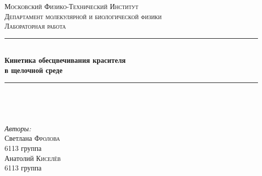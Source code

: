 \documentclass[a4paper, 12pt]{article}
\begin{document}
\begin{titlepage}

\newcommand{\HRule}{\rule{\linewidth}{0.5mm}} %

\center %
 

\textsc{\LARGE Московский Физико-Технический Институт}\\[1,5cm] %
\textsc{\Large Департамент молекулярной и биологической физики}\\[2cm] %
\textsc{\large Лабораторная работа}\\[0.5cm] %


\HRule
\\[0.4cm]
{ \huge \bfseries Кинетика обесцвечивания красителя \\в щелочной среде}
\\[0.2cm] %
\HRule
\\[1.5cm]


 
\begin{minipage}{0.4\textwidth}
	\begin{flushleft}		
	\end{flushleft}
\end{minipage}
~
\begin{minipage}{0.4\textwidth}
	\begin{flushright} \large
		\emph{Авторы:}\\
		Светлана \textsc{Фролова} \\
		6113 группа \\
		Анатолий \textsc{Киселёв} \\
		6113 группа
	\end{flushright}
\end{minipage}



\end{titlepage}
\end{document}
